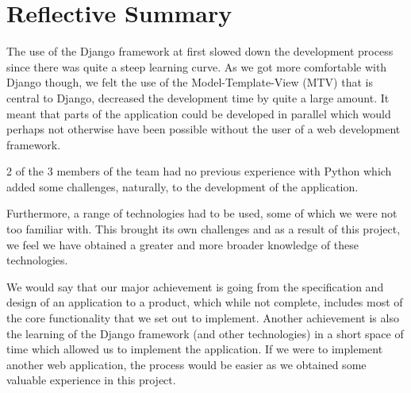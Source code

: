 \documentclass{sig-alt-release2}
\begin{document}
\section{Reflective Summary}
The use of the Django framework at first slowed down the development process since there was quite a steep learning curve. As we got more comfortable with Django though, we felt the use of the Model-Template-View (MTV) that is central to Django, decreased the development time by quite a large amount. It meant that parts of the application could be developed in parallel which would perhaps not otherwise have been possible without the user of a web development framework.

2 of the 3 members of the team had no previous experience with Python which added some challenges, naturally, to the development of the application.

Furthermore, a range of technologies had to be used, some of which we were not too familiar with. This brought its own challenges and as a result of this project, we feel we have obtained a greater and more broader knowledge of these technologies.

We would say that our major achievement is going from the specification and design of an application to a product, which while not complete, includes most of the core functionality that we set out to implement. Another achievement is also the learning of the Django framework (and other technologies) in a short space of time which allowed us to implement the application. If we were to implement another web application, the process would be easier as we obtained some valuable experience in this project.
\end{document}
